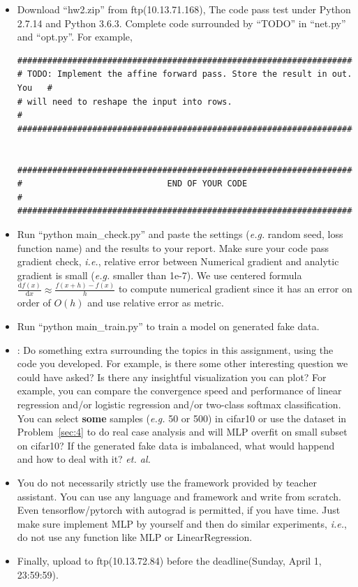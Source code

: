 \documentclass[12pt]{article}
\begin{document}
\begin{itemize}

	\item Download ``hw2.zip'' from ftp(10.13.71.168), The code pass test under Python 2.7.14 and Python 3.6.3. Complete code surrounded by ``TODO'' in ``net.py'' and ``opt.py''. For example,
	      \begin{verbatim}
###########################################################################
# TODO: Implement the affine forward pass. Store the result in out. You   #
# will need to reshape the input into rows.                               #
###########################################################################


###########################################################################
#                             END OF YOUR CODE                            #
###########################################################################
	\end{verbatim}
	\item Run ``python main\_check.py'' and paste the settings (\textit{e.g.} random seed, loss function name) and the results to  your report.  Make sure your code pass gradient check, \textit{i.e.}, relative error between Numerical gradient and analytic gradient is small (\textit{e.g.} smaller than 1e-7). We use centered formula $\displaystyle \frac{\mathrm{d}f(x)}{\mathrm{d}x} \approx \frac{f(x+h)-f(x)}{h}$ to compute numerical gradient since it has an error on order of $O(h)$ and use relative error as metric.
	\item Run ``python main\_train.py'' to train a model on generated fake data. 
	\item {\color{red}{Bonus(answer one of them is enough)}}: Do something extra surrounding the topics in this assignment, using the code you developed. For example, is there some other interesting question we could have asked? Is there any insightful visualization you can plot? For example, you can compare the convergence speed and performance of  linear regression and/or logistic regression and/or two-class softmax classification. You can select \textbf{some} samples (\textit{e.g.} 50 or 500) in cifar10 or use the dataset in Problem~\ref{sec:4} to do real case analysis and will MLP overfit on small subset on cifar10? If the generated fake data is imbalanced, what would happend and how to deal with it?  \textit{et. al.}
	\item You do not necessarily strictly use the framework provided by teacher assistant. You can use any language and framework and write from scratch.
	      Even tensorflow/pytorch with autograd is permitted, if you have time.
	      Just make sure implement MLP by yourself and then do similar experiments, \textit{i.e.}, do not use any function like MLP or LinearRegression.
	\item Finally, upload to ftp(10.13.72.84) before the deadline(Sunday, April 1, 23:59:59).
\end{itemize}
\end{document}
